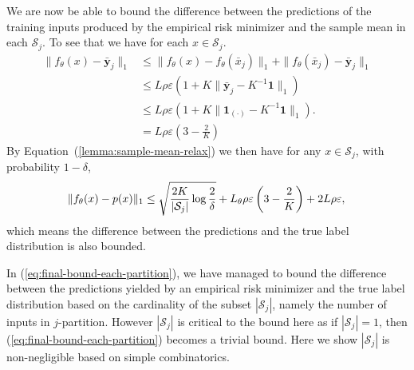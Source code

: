 We are now be able to bound the difference between the predictions of the training inputs produced by the empirical risk minimizer and the sample mean in each $\mathcal{S}_j$. To see that we have for each $x \in \mathcal{S}_j$. %
\begin{equation}
\begin{aligned}
    \|f_\theta(x) - \mathbf{\bar{y}}_j \|_1 
    & \le \|f_\theta(x) - f_\theta(\bar{x}_j) \|_1 + \|f_\theta(\bar{x}_j) - \mathbf{\bar{y}}_j \|_1  \\
    & \le L\rho\varepsilon ( 1 + K\|\mathbf{\bar{y}}_j -  K^{-1}\mathbf{1}\|_1)\\
    & \le L\rho\varepsilon ( 1 + K\|\mathbf{1}_{(\cdot)} - K^{-1}\mathbf{1}\|_1).\\
    & = L\rho\varepsilon\left(3 - \frac{2}{K}\right)
\end{aligned}
\end{equation}
By Equation~(\ref{lemma:sample-mean-relax}) we then have for any $x \in \mathcal{S}_j$, with probability $1 - \delta$,
\begin{equation}
    \label{eq:final-bound-each-partition}
    \|f_\theta(x) - p(x)\|_1 \le \sqrt{\frac{2K}{|\mathcal{S}_j|}\log\frac{2}{\delta}} + L_\theta\rho\varepsilon\left(3 - \frac{2}{K}\right) + 2L\rho\varepsilon,\\ 
\end{equation}
which means the difference between the predictions and the true label distribution is also bounded.




In (\ref{eq:final-bound-each-partition}), we have managed to bound the difference between the predictions yielded by an empirical risk minimizer and the true label distribution based on the cardinality of the subset $|\mathcal{S}_j|$, namely the number of inputs in $j$-partition. However $|\mathcal{S}_j|$ is critical to the bound here as if $|\mathcal{S}_j| = 1$, then (\ref{eq:final-bound-each-partition}) becomes a trivial bound. Here we show $|\mathcal{S}_j|$ is non-negligible based on simple combinatorics.

